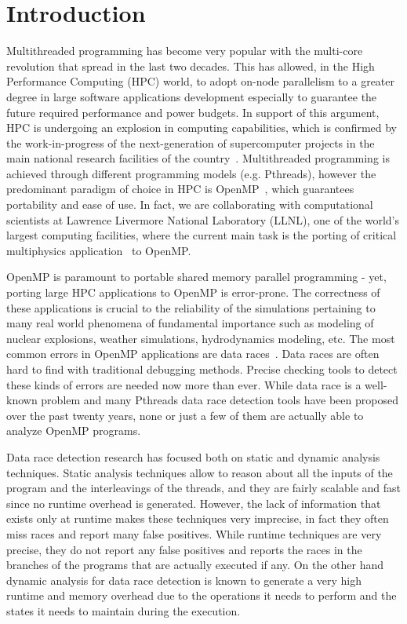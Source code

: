 \section{Introduction}
\label{sec:introduction}

Multithreaded programming has become very popular with the multi-core
revolution that spread in the last two decades.
%
This has allowed, in the High Performance Computing (HPC) world, to adopt
on-node parallelism to a greater degree in large software applications
development especially to guarantee the future required performance and power
budgets.
%
In support of this argument, HPC is undergoing an explosion in
computing capabilities, which is confirmed by the work-in-progress of the
next-generation of supercomputer projects in the main national research
facilities of the country~\cite{sierra, summit, trinity}.
%
Multithreaded programming is achieved through different programming models
(e.g. Pthreads), however the predominant paradigm of choice in HPC is
OpenMP~\cite{ompdoc}, which guarantees portability and ease of use.
%
In fact, we are collaborating with computational scientists at Lawrence
Livermore National Laboratory (LLNL), one of the world's largest computing
facilities, where the current main task is the porting of critical
multiphysics application~\cite{llnl-apps} to OpenMP.

OpenMP is paramount to portable shared memory parallel programming - yet,
porting large HPC applications to OpenMP is error-prone.
%
The correctness of these applications is crucial to the reliability of the
simulations pertaining to many real world phenomena of fundamental importance
such as modeling of nuclear explosions, weather simulations, hydrodynamics
modeling, etc.
%
The most common errors in OpenMP applications are data
races~\cite{sus_common_2008}.
%
Data races are often hard to find with traditional debugging methods.
%
Precise checking tools to detect these kinds of errors are needed now more
than ever.
%
While data race is a well-known problem and many Pthreads data race detection
tools have been proposed over the past twenty years, none or just a few of
them are actually able to analyze OpenMP programs.

Data race detection research has focused both on static and dynamic analysis
techniques.
%
Static analysis techniques allow to reason about all the inputs of the program
and the interleavings of the threads, and they are fairly scalable and fast
since no runtime overhead is generated.
%
However, the lack of information that exists only at runtime makes these
techniques very imprecise, in fact they often miss races and report many false
positives.
%
While runtime techniques are very precise, they do not report any false
positives and reports the races in the branches of the programs that are
actually executed if any.
%
On the other hand dynamic analysis for data race detection is known to
generate a very high runtime and memory overhead due to the operations it
needs to perform and the states it needs to maintain during the execution.

